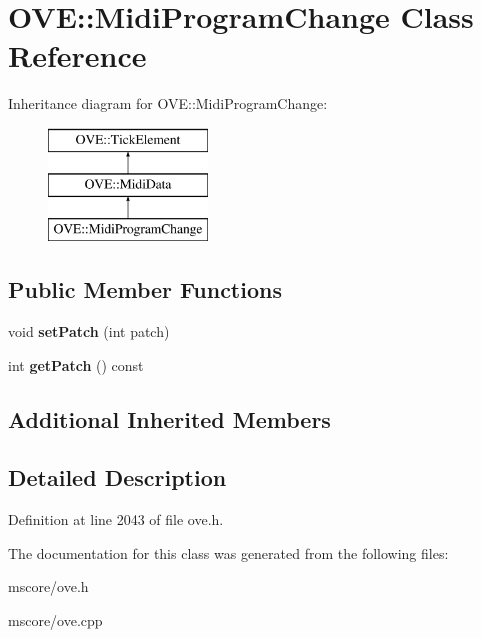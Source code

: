 \hypertarget{class_o_v_e_1_1_midi_program_change}{}\section{O\+VE\+:\+:Midi\+Program\+Change Class Reference}
\label{class_o_v_e_1_1_midi_program_change}
Inheritance diagram for O\+VE\+:\+:Midi\+Program\+Change\+:\begin{figure}[H]
\begin{center}
\leavevmode
\includegraphics[height=3.000000cm]{class_o_v_e_1_1_midi_program_change}
\end{center}
\end{figure}
\subsection*{Public Member Functions}
\begin{DoxyCompactItemize}
\item 
\mbox{\label{class_o_v_e_1_1_midi_program_change_a90bedf9c8dd4b764e0eed3d0cd56884b}} 
void {\bfseries set\+Patch} (int patch)
\item 
\mbox{\label{class_o_v_e_1_1_midi_program_change_af44e52fec1f4e569a149ef887a33b123}} 
int {\bfseries get\+Patch} () const
\end{DoxyCompactItemize}
\subsection*{Additional Inherited Members}


\subsection{Detailed Description}


Definition at line 2043 of file ove.\+h.



The documentation for this class was generated from the following files\+:\begin{DoxyCompactItemize}
\item 
mscore/ove.\+h\item 
mscore/ove.\+cpp\end{DoxyCompactItemize}
